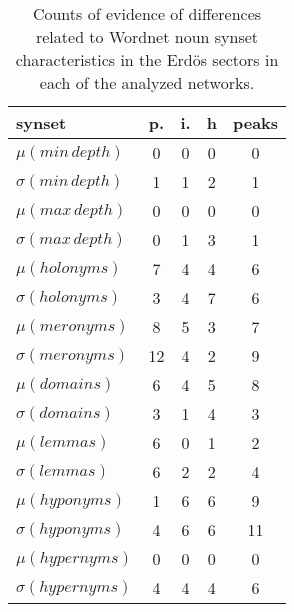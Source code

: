 \begin{table}[h!]
\begin{center}
\begin{tabular}{| l | c | c | c | c |}\hline
synset & p. & i. & h & peaks \\\hline
$\mu(min\,depth)$ & 0  & 0  & 0  & 0 \\\hline
$\sigma(min\,depth)$ & 1  & 1  & 2  & 1 \\\hline
$\mu(max\,depth)$ & 0  & 0  & 0  & 0 \\\hline
$\sigma(max\,depth)$ & 0  & 1  & 3  & 1 \\\hline
$\mu(holonyms)$ & 7  & 4  & 4  & 6 \\\hline
$\sigma(holonyms)$ & 3  & 4  & 7  & 6 \\\hline
$\mu(meronyms)$ & 8  & 5  & 3  & 7 \\\hline
$\sigma(meronyms)$ & 12  & 4  & 2  & 9 \\\hline
$\mu(domains)$ & 6  & 4  & 5  & 8 \\\hline
$\sigma(domains)$ & 3  & 1  & 4  & 3 \\\hline
$\mu(lemmas)$ & 6  & 0  & 1  & 2 \\\hline
$\sigma(lemmas)$ & 6  & 2  & 2  & 4 \\\hline
$\mu(hyponyms)$ & 1  & 6  & 6  & 9 \\\hline
$\sigma(hyponyms)$ & 4  & 6  & 6  & 11 \\\hline
$\mu(hypernyms)$ & 0  & 0  & 0  & 0 \\\hline
$\sigma(hypernyms)$ & 4  & 4  & 4  & 6 \\\hline
\end{tabular}
\caption{Counts of evidence of differences related to Wordnet noun synset characteristics in the Erd\"os sectors in each of the analyzed networks.}
\end{center}
\end{table}